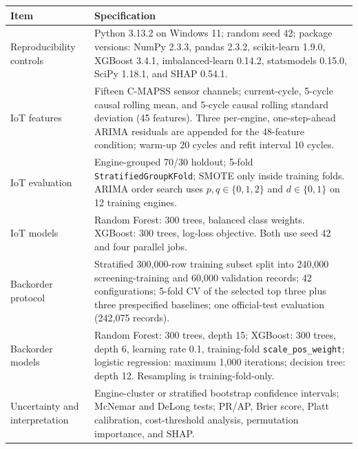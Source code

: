 \caption{Principal experimental configuration. Complete implementation details and
version-pinned requirements are provided in the supplementary repository.}
\label{tab:reproducibility}
\small
\begin{tabular}{p{3.5cm}p{11.0cm}}
\toprule
Item & Specification \\
\midrule
Reproducibility controls & Python 3.13.2 on Windows 11; random seed 42; package versions: NumPy 2.3.3, pandas 2.3.2, scikit-learn 1.9.0, XGBoost 3.4.1, imbalanced-learn 0.14.2, statsmodels 0.15.0, SciPy 1.18.1, and SHAP 0.54.1. \\
IoT features & Fifteen C-MAPSS sensor channels; current-cycle, 5-cycle causal rolling mean, and 5-cycle causal rolling standard deviation (45 features). Three per-engine, one-step-ahead ARIMA residuals are appended for the 48-feature condition; warm-up 20 cycles and refit interval 10 cycles. \\
IoT evaluation & Engine-grouped 70/30 holdout; 5-fold \texttt{StratifiedGroupKFold}; SMOTE only inside training folds. ARIMA order search uses $p,q\in\{0,1,2\}$ and $d\in\{0,1\}$ on 12 training engines. \\
IoT models & Random Forest: 300 trees, balanced class weights. XGBoost: 300 trees, log-loss objective. Both use seed 42 and four parallel jobs. \\
Backorder protocol & Stratified 300,000-row training subset split into 240,000 screening-training and 60,000 validation records; 42 configurations; 5-fold CV of the selected top three plus three prespecified baselines; one official-test evaluation (242,075 records). \\
Backorder models & Random Forest: 300 trees, depth 15; XGBoost: 300 trees, depth 6, learning rate 0.1, training-fold \texttt{scale\_pos\_weight}; logistic regression: maximum 1,000 iterations; decision tree: depth 12. Resampling is training-fold-only. \\
Uncertainty and interpretation & Engine-cluster or stratified bootstrap confidence intervals; McNemar and DeLong tests; PR/AP, Brier score, Platt calibration, cost-threshold analysis, permutation importance, and SHAP. \\
\bottomrule
\end{tabular}
